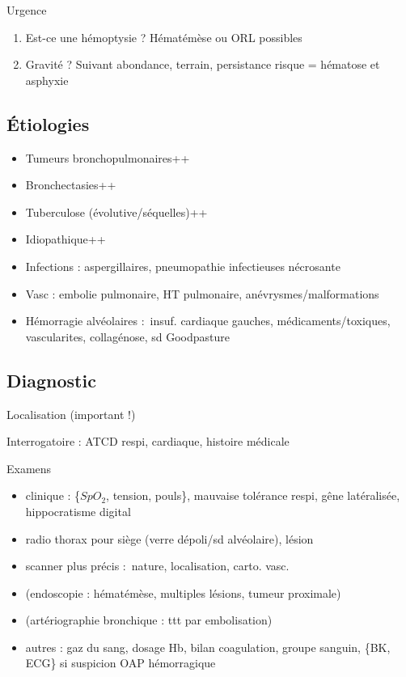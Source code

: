 \documentclass{book}
\begin{document}
Urgence \faBomb

\begin{enumerate}
\item Est-ce une hémoptysie ? Hématémèse ou ORL possibles
\item Gravité ? Suivant abondance, terrain, persistance \thus risque = hématose et asphyxie
\end{enumerate}

\subsection{Étiologies}
\label{sec:org5e3d232}

\begin{itemize}
\item Tumeurs bronchopulmonaires++
\item Bronchectasies++
\item Tuberculose (évolutive/séquelles)++
\item Idiopathique++
\item Infections : aspergillaires, pneumopathie infectieuses nécrosante
\item Vasc : embolie pulmonaire, HT pulmonaire, anévrysmes/malformations
\item Hémorragie alvéolaires : insuf. cardiaque gauches, médicaments/toxiques,
vascularites, collagénose, sd Goodpasture
\end{itemize}


\subsection{Diagnostic}
\label{sec:orgd6c2cab}
Localisation (important !)

Interrogatoire : ATCD respi, cardiaque, histoire médicale

Examens 

\begin{itemize}
\item clinique : \{\(SpO_2\), tension, pouls\}, mauvaise tolérance respi, gêne
latéralisée, hippocratisme digital
\item radio thorax pour siège (verre dépoli/sd alvéolaire), lésion
\item scanner plus précis : nature, localisation, carto. vasc.
\item (endoscopie : hématémèse, multiples lésions, tumeur proximale)
\item (artériographie bronchique : ttt par embolisation)
\item autres : gaz du sang, dosage Hb, bilan coagulation, groupe sanguin, \{BK,
ECG\} si suspicion OAP hémorragique
\end{itemize}
\end{document}
